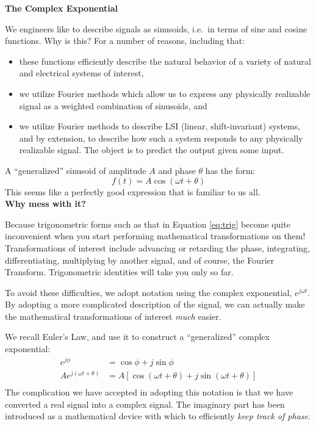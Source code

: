 \documentclass[11pt]{report}
\begin{document}
\setcounter{page}{1}
\setcounter{equation}{0}
\setcounter{figure}{0}
\begin{center}
\Large{\textbf{The Complex Exponential}}
\normalsize

\end{center}


We engineers like to describe signals as sinusoids, i.e.\
in terms of sine and cosine functions.  Why is this? 
For a number of reasons, including that:
\begin{itemize}
\item these functions efficiently describe the natural behavior
of a variety of natural and electrical systems of interest,
\item we utilize Fourier methods which allow us to express
any physically realizable signal as a weighted combination of sinusoids, and
\item we utilize Fourier methods to describe LSI (linear,
shift-invariant) systems, and by extension, to describe how such a
system responds to any physically realizable signal. The object is to
predict the output given some input.
\end{itemize}
A ``generalized'' sinusoid of amplitude $A$ and phase $\theta$ has the form:
\begin{equation}
f(t) = A \cos(\omega t + \theta)
\label{eq:trig}
\end{equation}
This seems like a perfectly good expression that is familiar to us
all.\\

\textbf{Why mess with it?} 

Because trigonometric forms such as that in Equation \ref{eq:trig}
become quite inconvenient when you start performing mathematical
transformations on them! Transformations of interest include advancing
or retarding the phase, integrating, differentiating, multiplying by
another signal, and of course, the Fourier Transform. Trigonometric
identities will take you only so far.

To avoid these difficulties, we adopt notation using the complex exponential,
$e^{j\omega t}$. By adopting a more complicated description of the
signal, we can actually make the mathematical transformations of
interest \textit{much} easier.

We recall Euler's Law, and use it to construct a ``generalized''
complex exponential:
\begin{equation}
\begin{split}
e^{j\phi} &= \cos\phi + j\sin\phi\\
Ae^{j(\omega t + \theta)} &=A[\cos(\omega t + \theta) + j\sin(\omega t + \theta)]\\
\end{split}
\end{equation}
The complication we have accepted in adopting this notation is that we
have converted a real signal into a complex signal. The imaginary part
has been introduced as a mathematical device with which to efficiently 
\textit{keep track of phase}. 
\end{document}
